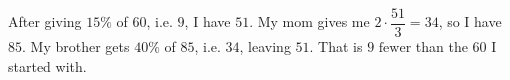 After giving $15\%$ of $60$, i.e. $9$, I have $51$. My mom gives me $2\cdot\dfrac{51}{3}=34$, so I have $85$. My brother gets $40\%$ of $85$, i.e. $34$, leaving $51$. That is $\boxed{9\text{ fewer}}$ than the $60$ I started with.
